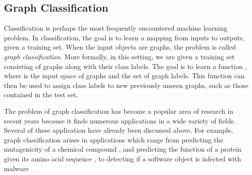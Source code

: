 \documentclass[twoside,11pt]{article}
\begin{document}
\subsection{Graph Classification}
Classification is perhaps the most frequently encountered machine learning problem.
In classification, the goal is to learn a mapping from inputs to outputs, given a training set.
When the input objects are graphs, the problem is called \textit{graph classification}.
More formally, in this setting, we are given a training set  consisting of  graphs along with their class labels.
The goal is to learn a function , where  is the input space of graphs and  the set of graph labels.
This function can then be used to assign class labels to new previously unseen graphs, such as those contained in the test set.

The problem of graph classification has become a popular area of research in recent years because it finds numerous applications in a wide variety of fields.
Several of these application have already been discussed above.
For example, graph classification arises in applications which range from predicting the mutagenicity of a chemical compound \cite{swamidass2005kernels}, and predicting the function of a protein given its amino acid sequence \cite{borgwardt2005protein}, to detecting if a software object is infected with malware \cite{wagner2009malware}.
\end{document}
